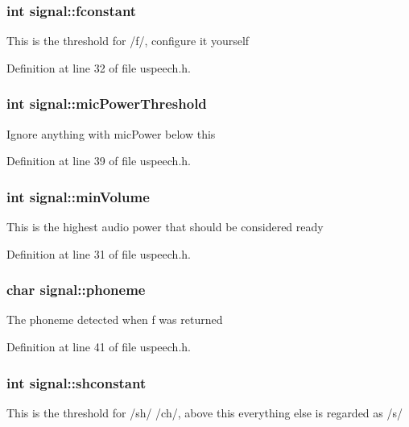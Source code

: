 \hypertarget{classsignal_ae256fa87a2b25841cda3155d0519172c}{
\subsubsection[{fconstant}]{\setlength{\rightskip}{0pt plus 5cm}int signal\-::fconstant}}\label{classsignal_ae256fa87a2b25841cda3155d0519172c}
This is the threshold for /f/, configure it yourself 

Definition at line 32 of file uspeech.\-h.

\hypertarget{classsignal_a052c94e3579fe8145fa6a891bd11f9ab}{
\subsubsection[{mic\-Power\-Threshold}]{\setlength{\rightskip}{0pt plus 5cm}int signal\-::mic\-Power\-Threshold}}\label{classsignal_a052c94e3579fe8145fa6a891bd11f9ab}
Ignore anything with mic\-Power below this 

Definition at line 39 of file uspeech.\-h.

\hypertarget{classsignal_a4604a8a9760752f00af96457a34debf9}{
\subsubsection[{min\-Volume}]{\setlength{\rightskip}{0pt plus 5cm}int signal\-::min\-Volume}}\label{classsignal_a4604a8a9760752f00af96457a34debf9}
This is the highest audio power that should be considered ready 

Definition at line 31 of file uspeech.\-h.

\hypertarget{classsignal_aea8e52b903d491e25065ac261139edd2}{
\subsubsection[{phoneme}]{\setlength{\rightskip}{0pt plus 5cm}char signal\-::phoneme}}\label{classsignal_aea8e52b903d491e25065ac261139edd2}
The phoneme detected when f was returned 

Definition at line 41 of file uspeech.\-h.

\hypertarget{classsignal_a6697308a69e450ec5322b8438a442b36}{
\subsubsection[{shconstant}]{\setlength{\rightskip}{0pt plus 5cm}int signal\-::shconstant}}\label{classsignal_a6697308a69e450ec5322b8438a442b36}
This is the threshold for /sh/ /ch/, above this everything else is regarded as /s/ 

